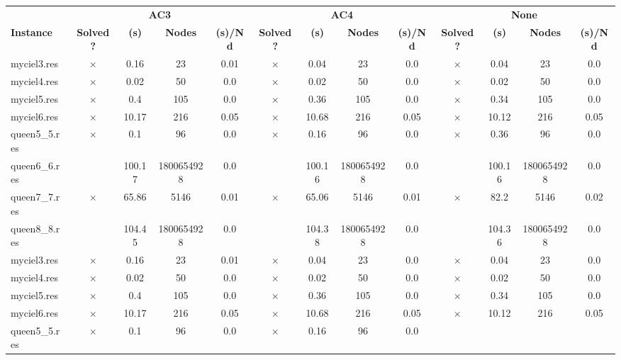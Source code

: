 \documentclass[main.tex]{subfiles}
\begin{document}
\thispagestyle{empty}

\begin{landscape}
\begin{center}
\renewcommand{\arraystretch}{1.4} 
\begin{tabular}{l
cccccccccccc}
	\hline
 & \multicolumn{4}{c}{\textbf{AC3}} & \multicolumn{4}{c}{\textbf{AC4}} & \multicolumn{4}{c}{\textbf{None}}\\
\textbf{Instance}  & \textbf{Solved ?} & \textbf{(s)} & \textbf{Nodes} & \textbf{(s)/Nd} & \textbf{Solved ?} & \textbf{(s)} & \textbf{Nodes} & \textbf{(s)/Nd} & \textbf{Solved ?} & \textbf{(s)} & \textbf{Nodes} & \textbf{(s)/Nd}\\\hline

myciel3.res & $\times$ & 0.16 & 23 & 0.01
 & $\times$ & 0.04 & 23 & 0.0
 & $\times$ & 0.04 & 23 & 0.0
\\
myciel4.res & $\times$ & 0.02 & 50 & 0.0
 & $\times$ & 0.02 & 50 & 0.0
 & $\times$ & 0.02 & 50 & 0.0
\\
myciel5.res & $\times$ & 0.4 & 105 & 0.0
 & $\times$ & 0.36 & 105 & 0.0
 & $\times$ & 0.34 & 105 & 0.0
\\
myciel6.res & $\times$ & 10.17 & 216 & 0.05
 & $\times$ & 10.68 & 216 & 0.05
 & $\times$ & 10.12 & 216 & 0.05
\\
queen5\_5.res & $\times$ & 0.1 & 96 & 0.0
 & $\times$ & 0.16 & 96 & 0.0
 & $\times$ & 0.36 & 96 & 0.0
\\
queen6\_6.res &  & 100.17 & 1800654928 & 0.0
 &  & 100.16 & 1800654928 & 0.0
 &  & 100.16 & 1800654928 & 0.0
\\
queen7\_7.res & $\times$ & 65.86 & 5146 & 0.01
 & $\times$ & 65.06 & 5146 & 0.01
 & $\times$ & 82.2 & 5146 & 0.02
\\
queen8\_8.res &  & 104.45 & 1800654928 & 0.0
 &  & 104.38 & 1800654928 & 0.0
 &  & 104.36 & 1800654928 & 0.0
\\
myciel3.res & $\times$ & 0.16 & 23 & 0.01
 & $\times$ & 0.04 & 23 & 0.0
 & $\times$ & 0.04 & 23 & 0.0
\\
myciel4.res & $\times$ & 0.02 & 50 & 0.0
 & $\times$ & 0.02 & 50 & 0.0
 & $\times$ & 0.02 & 50 & 0.0
\\
myciel5.res & $\times$ & 0.4 & 105 & 0.0
 & $\times$ & 0.36 & 105 & 0.0
 & $\times$ & 0.34 & 105 & 0.0
\\
myciel6.res & $\times$ & 10.17 & 216 & 0.05
 & $\times$ & 10.68 & 216 & 0.05
 & $\times$ & 10.12 & 216 & 0.05
\\
queen5\_5.res & $\times$ & 0.1 & 96 & 0.0
 & $\times$ & 0.16 & 96 & 0.0

\end{tabular}
\end{center}
\end{landscape}
\end{document}
